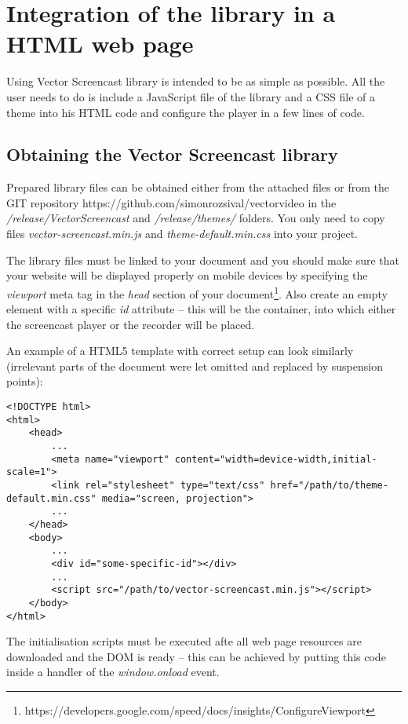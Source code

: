\chapter{Integration of the library in a HTML web page}
\label{ch:integration}

Using Vector Screencast library is intended to be as simple as possible. All the user needs to do is include a JavaScript file of the library and a CSS file of a theme into his HTML code and configure the player in a few lines of code.

\section{Obtaining the Vector Screencast library}
Prepared library files can be obtained either from the attached files or from the GIT repository https://github.com/simonrozsival/vectorvideo in the \textit{/release/VectorScreencast} and \textit{/release/themes/} folders. You only need to copy files \textit{vector-screencast.min.js} and \textit{theme-default.min.css} into your project.

The library files must be linked to your document and you should make sure that your website will be displayed properly on mobile devices by specifying the \textit{viewport} meta tag in the \textit{head} section of your document\footnote{https://developers.google.com/speed/docs/insights/ConfigureViewport}. Also create an empty element with a specific \textit{id} attribute -- this will be the container, into which either the screencast player or the recorder will be placed.

An example of a HTML5 template with correct setup can look similarly (irrelevant parts of the document were let omitted and replaced by suspension points):

\begin{lstlisting}
<!DOCTYPE html>
<html>
	<head>
		...
		<meta name="viewport" content="width=device-width,initial-scale=1">
		<link rel="stylesheet" type="text/css" href="/path/to/theme-default.min.css" media="screen, projection">
		...
	</head>
	<body>
		...
		<div id="some-specific-id"></div>
		...
		<script src="/path/to/vector-screencast.min.js"></script>
	</body>
</html>
\end{lstlisting}

The initialisation scripts must be executed afte all web page resources are downloaded and the DOM is ready -- this can be achieved by putting this code inside a handler of the \textit{window.onload} event.

